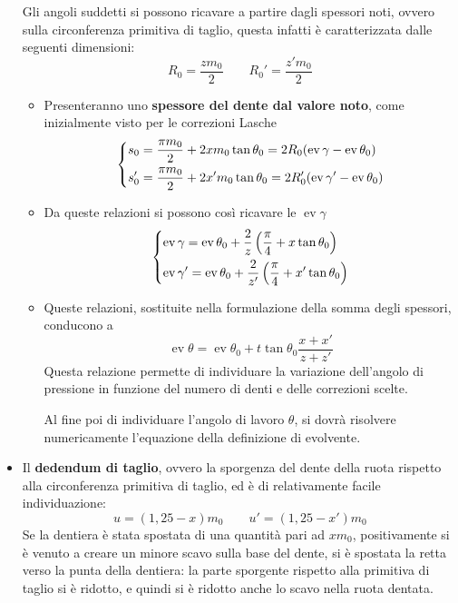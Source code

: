 \documentclass[a4paper, 15pt]{article}
\DeclareMathOperator{\ev}{ev}
\begin{document}
\begin{adjustwidth}{2in}{}
\begin{itemize}
				Gli angoli suddetti si possono ricavare a partire dagli spessori noti, ovvero sulla circonferenza primitiva di taglio, questa infatti è caratterizzata dalle seguenti dimensioni:
				\[R_0 = \dfrac{zm_0}{2} \qquad R_0' = \dfrac{z'm_0}{2}\] 
				\begin{itemize}
				\item Presenteranno uno \textbf{spessore del dente dal valore noto}, come inizialmente visto per le correzioni Lasche
				\[\begin{dcases}
					s_0 = \dfrac{\pi m_0}{2} + 2xm_0\tan\theta_0 = 2R_0(\ev\gamma - \ev\theta_0) \\
					s_0' = \dfrac{\pi m_0}{2} + 2x'm_0\tan\theta_0	= 2R_0'(\ev\gamma' - \ev\theta_0)				
				\end{dcases}\]
				\item Da queste relazioni si possono così ricavare le $\ev\gamma$
				\[\begin{dcases}
					\ev\gamma = \ev\theta_0 + \dfrac{2}{z}\left(\dfrac{\pi}{4} + x\tan\theta_0\right) \\
					\ev\gamma' = \ev\theta_0 + \dfrac{2}{z'}\left(\dfrac{\pi}{4} + x'\tan\theta_0\right) \\
				\end{dcases}\]
				\item Queste relazioni, sostituite nella formulazione della somma degli spessori, conducono a 
				\[\ev\theta = \ev\theta_0 + t\tan\theta_0 \dfrac{x+x'}{z + z'}\]
				Questa relazione permette di individuare la variazione dell'angolo di pressione in funzione del numero di denti e delle correzioni scelte. 
				
				Al fine poi di individuare l'angolo di lavoro $\theta$, si dovrà risolvere numericamente l'equazione della definizione di evolvente.
				\end{itemize} 
				
				\item Il \textbf{dedendum di taglio}, ovvero la sporgenza del dente della ruota rispetto alla circonferenza primitiva di taglio, ed è di relativamente facile individuazione:
				\[u = (1,25 - x)m_0 \qquad u' = (1,25 - x')m_0\] 
				Se la dentiera è stata spostata di una quantità pari ad $xm_0$, positivamente si è venuto a creare un minore scavo sulla base del dente, si è spostata la retta verso la punta della dentiera: la parte sporgente rispetto alla primitiva di taglio si è ridotto, e quindi si è ridotto anche lo scavo nella ruota dentata. 
				

\end{itemize}
\end{adjustwidth}
\end{document}
